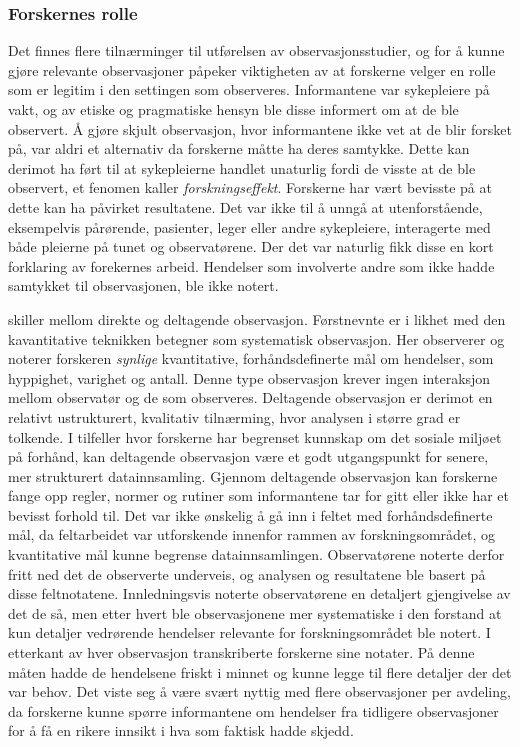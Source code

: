 \subsubsection{Forskernes rolle}
Det finnes flere tilnærminger til utførelsen av observasjonsstudier, og for å kunne gjøre relevante observasjoner påpeker \citet{Tjora} viktigheten av at forskerne velger en rolle som er legitim i den settingen som observeres. Informantene var sykepleiere på vakt, og av etiske og pragmatiske hensyn ble disse informert om at de ble observert. Å gjøre skjult observasjon, hvor informantene ikke vet at de blir forsket på, var aldri et alternativ da forskerne måtte ha deres samtykke. Dette kan derimot ha ført til at sykepleierne handlet unaturlig fordi de visste at de ble observert, et fenomen \citet{Tjora} kaller \textit{forskningseffekt}. Forskerne har vært bevisste på at dette kan ha påvirket resultatene. Det var ikke til å unngå at utenforstående, eksempelvis pårørende, pasienter, leger eller andre sykepleiere, interagerte med både pleierne på tunet og observatørene. Der det var naturlig fikk disse en kort forklaring av forekernes arbeid. Hendelser som involverte andre som ikke hadde samtykket til observasjonen, ble ikke notert.
 
\noindent
\citet{Greg} skiller mellom direkte og deltagende observasjon. Førstnevnte er i likhet med den kavantitative teknikken \citet{Oates} betegner som systematisk observasjon. Her observerer og noterer forskeren \textit{synlige} kvantitative, forhåndsdefinerte mål om hendelser, som hyppighet, varighet og antall. Denne type observasjon krever ingen interaksjon mellom observatør og de som observeres.
Deltagende observasjon er derimot en relativt ustrukturert, kvalitativ tilnærming, hvor analysen i større grad er tolkende. I tilfeller hvor forskerne har begrenset kunnskap om det sosiale miljøet på forhånd, kan deltagende observasjon være et godt utgangspunkt for senere, mer strukturert datainnsamling. Gjennom deltagende observasjon kan forskerne fange opp regler, normer og rutiner som informantene tar for gitt eller ikke har et bevisst forhold til.
Det var ikke ønskelig å gå inn i feltet med forhåndsdefinerte mål, da feltarbeidet var utforskende innenfor rammen av forskningsområdet, og kvantitative mål kunne begrense datainnsamlingen. Observatørene noterte derfor fritt ned det de observerte underveis, og analysen og resultatene ble basert på disse feltnotatene. Innledningsvis noterte observatørene en detaljert gjengivelse av det de så, men etter hvert ble observasjonene mer systematiske i den forstand at kun detaljer vedrørende hendelser relevante for forskningsområdet ble notert. I etterkant av hver observasjon transkriberte forskerne sine notater. På denne måten hadde de hendelsene friskt i minnet og kunne legge til flere detaljer der det var behov. Det viste seg å være svært nyttig med flere observasjoner per avdeling, da forskerne kunne spørre informantene om hendelser fra tidligere observasjoner for å få en rikere innsikt i hva som faktisk hadde skjedd.
 
